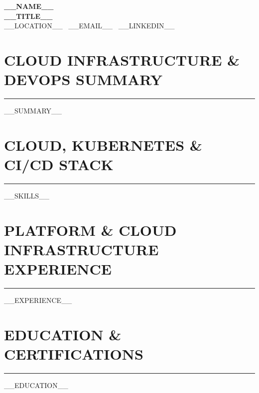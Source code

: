 \documentclass[10pt,letterpaper]{article}
\begin{document}
\begin{center}
    {\LARGE \textbf{__NAME__}} \\
    \vspace{2pt}
    \textbf{__TITLE__} \\
    __LOCATION__ \textbar\ __EMAIL__ \textbar\ __LINKEDIN__
\end{center}

\vspace{-6pt}
\section*{CLOUD INFRASTRUCTURE \& DEVOPS SUMMARY}
\vspace{-4pt}
\hrule
\vspace{4pt}
__SUMMARY__

\section*{CLOUD, KUBERNETES \& CI/CD STACK}
\vspace{-4pt}
\hrule
\vspace{4pt}
__SKILLS__

\section*{PLATFORM \& CLOUD INFRASTRUCTURE EXPERIENCE}
\vspace{-4pt}
\hrule
\vspace{4pt}
__EXPERIENCE__

\section*{EDUCATION \& CERTIFICATIONS}
\vspace{-4pt}
\hrule
\vspace{4pt}
__EDUCATION__
\end{document}
